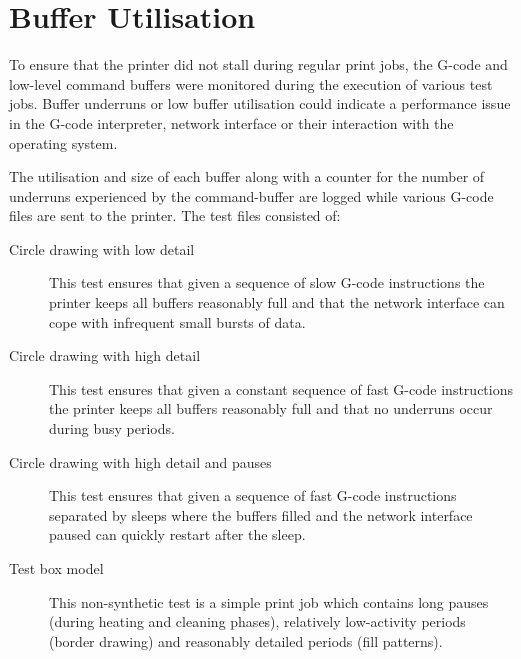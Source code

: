 	
	\section{Buffer Utilisation}
		
		To ensure that the printer did not stall during regular print jobs, the
		G-code and low-level command buffers were monitored during the execution of
		various test jobs. Buffer underruns or low buffer utilisation could indicate
		a performance issue in the G-code interpreter, network interface or their
		interaction with the operating system.
		
		The utilisation and size of each buffer along with a counter for the number
		of underruns experienced by the command-buffer are logged while various
		G-code files are sent to the printer. The test files consisted of:
		
		\begin{description}
			
			\item[Circle drawing with low detail] This test ensures that given a
			sequence of slow G-code instructions the printer keeps all buffers
			reasonably full and that the network interface can cope with infrequent
			small bursts of data.
			
			\item[Circle drawing with high detail] This test ensures that given a
			constant sequence of fast G-code instructions the printer keeps all
			buffers reasonably full and that no underruns occur during busy periods.
			
			\item[Circle drawing with high detail and pauses] This test ensures that
			given a sequence of fast G-code instructions separated by sleeps where the
			buffers filled and the network interface paused can quickly restart after
			the sleep.
			
			\item[Test box model] This non-synthetic test is a simple print job which
			contains long pauses (during heating and cleaning phases), relatively
			low-activity periods (border drawing) and reasonably detailed periods
			(fill patterns).
			
		\end{description}
		
